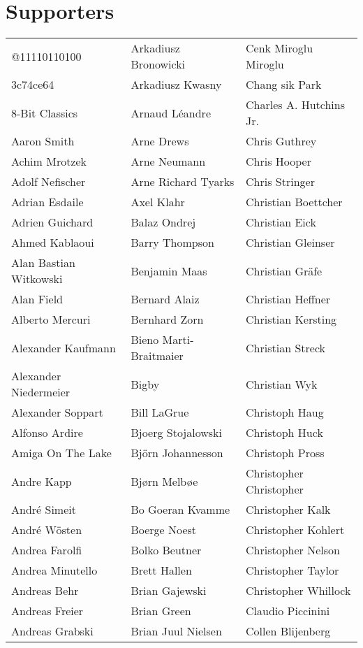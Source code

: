 \section{Supporters}
\setlength{\tabcolsep}{1mm}
\begin{tabular}{p{4.5cm}p{4.5cm}p{4.5cm}}
@11110110100 & Arkadiusz Bronowicki & Cenk Miroglu Miroglu \\
3c74ce64 & Arkadiusz Kwasny & Chang sik Park \\
8-Bit Classics & Arnaud Léandre & Charles A. Hutchins Jr. \\
Aaron Smith & Arne Drews & Chris Guthrey \\
Achim Mrotzek & Arne Neumann & Chris Hooper \\
Adolf Nefischer & Arne Richard Tyarks & Chris Stringer \\
Adrian Esdaile & Axel Klahr & Christian Boettcher \\
Adrien Guichard & Balaz Ondrej & Christian Eick \\
Ahmed Kablaoui & Barry Thompson & Christian Gleinser \\
Alan Bastian Witkowski & Benjamin Maas & Christian Gräfe \\
Alan Field & Bernard Alaiz & Christian Heffner \\
Alberto Mercuri & Bernhard Zorn & Christian Kersting \\
Alexander Kaufmann & Bieno Marti-Braitmaier & Christian Streck \\
Alexander Niedermeier & Bigby & Christian Wyk \\
Alexander Soppart & Bill LaGrue & Christoph Haug \\
Alfonso Ardire & Bjoerg Stojalowski & Christoph Huck \\
Amiga On The Lake & Björn Johannesson & Christoph Pross \\
Andre Kapp & Bjørn Melbøe & Christopher Christopher \\
André Simeit & Bo Goeran Kvamme & Christopher Kalk \\
André Wösten & Boerge Noest & Christopher Kohlert \\
Andrea Farolfi & Bolko Beutner & Christopher Nelson \\
Andrea Minutello & Brett Hallen & Christopher Taylor \\
Andreas Behr & Brian Gajewski & Christopher Whillock \\
Andreas Freier & Brian Green & Claudio Piccinini \\
Andreas Grabski & Brian Juul Nielsen & Collen Blijenberg \\

\end{tabular}
